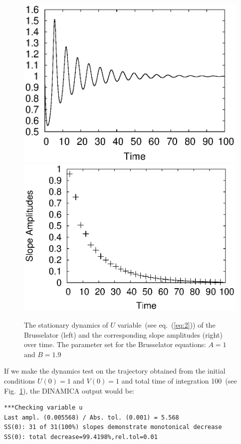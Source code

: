 \documentclass[11pt,a4paper]{article}
\begin{document}
\begin{figure}[h]
  \centering
  \includegraphics[scale=0.45]{sa_ex_bruss_ss}
  \includegraphics[scale=0.45]{sa_ex_bruss_ss_sl_ampl}
  \caption{The stationary dynamics of $U$ variable~(see eq.~(\ref{eq:2})) of the
    Brusselator (left) and the corresponding slope amplitudes (right) over time. The
    parameter set for the Brusselator equations: $A=1$ and $B=1.9$}
\label{fig:ss_bruss}
\end{figure}


If we make the dynamics test on the trajectory obtained from the initial conditions
$U(0)=1$ and $V(0)=1$ and total time of integration 100~(see
Fig.~\ref{fig:ss_bruss}), the DINAMICA output would be:
\begin{verbatim}
***Checking variable u
Last ampl. (0.005568) / Abs. tol. (0.001) = 5.568
SS(0): 31 of 31(100%) slopes demonstrate monotonical decrease
SS(0): total decrease=99.4198%,rel.tol=0.01
\end{verbatim}
\end{document}
